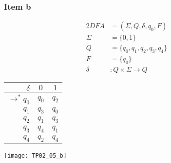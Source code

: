 {\subsubsection{Item b}
\begin{center}
	\begin{minipage}[c]{0.25\textwidth}
		\begin{alignat*}{2}
			DFA    &= (\Sigma, Q, \delta, q_0, F)\\
			\Sigma &= \{0,1\}\\
			Q      &= \{q_0,q_1,q_2,q_3,q_4\}\\
			F      &= \{q_0\}\\
			\delta &\colon Q \times \Sigma \rightarrow Q
		\end{alignat*}
	\end{minipage}
	\begin{minipage}[c]{0.2\textwidth}
		\begin{center}
		\begin{tabular}{ r | c c }
 			$\delta              $ & $0  $ & $1  $ \\ \hline
 			$\rightarrow^\ast q_0$ & $q_0$ & $q_2$ \\  
 			$                 q_1$ & $q_3$ & $q_0$ \\
 			$                 q_2$ & $q_1$ & $q_3$ \\
 			$                 q_3$ & $q_4$ & $q_1$ \\
 			$                 q_4$ & $q_2$ & $q_4$
		\end{tabular}
		\end{center}
	\end{minipage}
	\begin{minipage}[c]{0.45\textwidth}
		\begin{center} \texttt{[image: TP02\_05\_b]} \end{center}
	\end{minipage}
\end{center}
}
